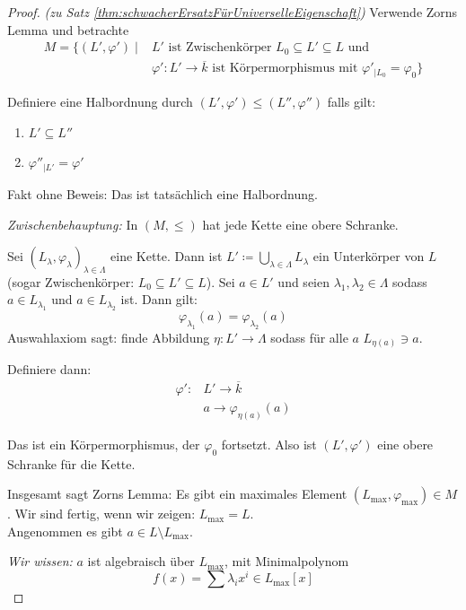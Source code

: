 \documentclass[a4paper,12pt,numbers=noenddot,parskip=full]{scrartcl}
\theoremstyle{dotless}
\theoremstyle{remark}
\begin{document}
	\begin{proof} \textit{(zu Satz \ref{thm:schwacherErsatzFürUniverselleEigenschaft})}
		Verwende Zorns Lemma und betrachte
		\begin{align*}
			M = \{ (L', \varphi') \mid &L' \text{ ist Zwischenkörper } L_0 \subseteq L' \subseteq L \text{ und } \\
			&\varphi': L' \to \overline{k} \text{ ist Körpermorphismus mit } \varphi'_{\mid L_0} = \varphi_0 \}
		\end{align*}
		
		Definiere eine Halbordnung durch $(L', \varphi') \leq (L'', \varphi'')$ falls gilt:
		\begin{enumerate}
			\item $L' \subseteq L''$
			\item $\varphi''_{\mid L'} = \varphi'$
		\end{enumerate}
		Fakt ohne Beweis: Das ist tatsächlich eine Halbordnung.
		
		\textit{Zwischenbehauptung:} In $(M, \leq)$ hat jede Kette eine obere Schranke.
		
		Sei $(L_\lambda, \varphi_\lambda)_{\lambda \in \Lambda}$ eine Kette. Dann ist $L' \coloneqq \bigcup_{\lambda \in \Lambda} L_\lambda$ ein Unterkörper von $L$ (sogar Zwischenkörper: $L_0 \subseteq L' \subseteq L$). Sei $a \in L'$ und seien $\lambda_1, \lambda_2 \in \Lambda$ sodass $a \in L_{\lambda_1}$ und $a \in L_{\lambda_2}$ ist. Dann gilt:
		\begin{equation*}
			\varphi_{\lambda_1}(a) = \varphi_{\lambda_2}(a)
		\end{equation*}
		Auswahlaxiom sagt: finde Abbildung $\eta: L' \to \Lambda$ sodass für alle $a$ $L_{\eta(a)} \ni a$.
		
		Definiere dann:
		\begin{align*}
			\varphi': &L' \to \overline{k} \\
			&a \to \varphi_{\eta(a)}(a)
		\end{align*}
		
		Das ist ein Körpermorphismus, der $\varphi_0$ fortsetzt. Also ist $(L', \varphi')$ eine obere Schranke für die Kette.
		
		Insgesamt sagt Zorns Lemma: Es gibt ein maximales Element $(L_\text{max}, \varphi_\text{max}) \in M$. Wir sind fertig, wenn wir zeigen:
		$L_\text{max} = L$. \\Angenommen es gibt $a \in L \setminus L_\text{max}$.
		
		\textit{Wir wissen:} $a$ ist algebraisch über $L_\text{max}$, mit Minimalpolynom
		\begin{equation*}
			f(x) = \sum \lambda_i x^i \in L_\text{max}[x]
		\end{equation*}
		

\end{proof}
\end{document}
